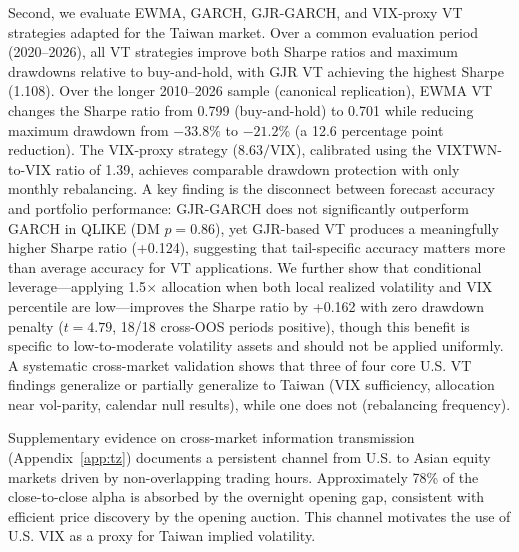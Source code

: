 Second, we evaluate EWMA, GARCH, GJR-GARCH, and VIX-proxy VT strategies adapted for the Taiwan market. Over a common evaluation period (2020--2026), all VT strategies improve both Sharpe ratios and maximum drawdowns relative to buy-and-hold, with GJR VT achieving the highest Sharpe (1.108). Over the longer 2010--2026 sample (canonical replication), EWMA VT changes the Sharpe ratio from 0.799 (buy-and-hold) to 0.701 while reducing maximum drawdown from $-33.8\%$ to $-21.2\%$ (a 12.6 percentage point reduction). The VIX-proxy strategy ($8.63/\text{VIX}$), calibrated using the VIXTWN-to-VIX ratio of 1.39, achieves comparable drawdown protection with only monthly rebalancing. A key finding is the disconnect between forecast accuracy and portfolio performance: GJR-GARCH does not significantly outperform GARCH in QLIKE (DM $p = 0.86$), yet GJR-based VT produces a meaningfully higher Sharpe ratio (+0.124), suggesting that tail-specific accuracy matters more than average accuracy for VT applications. We further show that conditional leverage---applying 1.5$\times$ allocation when both local realized volatility and VIX percentile are low---improves the Sharpe ratio by +0.162 with zero drawdown penalty ($t = 4.79$, 18/18 cross-OOS periods positive), though this benefit is specific to low-to-moderate volatility assets and should not be applied uniformly. A systematic cross-market validation shows that three of four core U.S. VT findings generalize or partially generalize to Taiwan (VIX sufficiency, allocation near vol-parity, calendar null results), while one does not (rebalancing frequency).

Supplementary evidence on cross-market information transmission (Appendix~\ref{app:tz}) documents a persistent channel from U.S. to Asian equity markets driven by non-overlapping trading hours. Approximately 78\% of the close-to-close alpha is absorbed by the overnight opening gap, consistent with efficient price discovery by the opening auction. This channel motivates the use of U.S. VIX as a proxy for Taiwan implied volatility.

